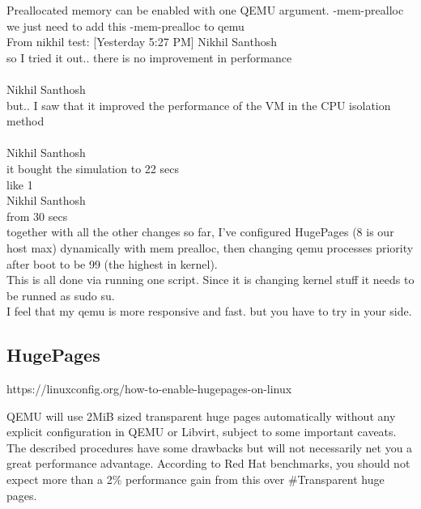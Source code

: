 \documentclass[11pt, a4paper, oneside]{article}
\theoremstyle{definition}
\begin{document}
Preallocated memory can be enabled with one QEMU argument. -mem-prealloc\\

we just need to add this -mem-prealloc to qemu\\

From nikhil test:
[Yesterday 5:27 PM] Nikhil Santhosh\\
so I tried it out.. there is no improvement in performance\\
\\
Nikhil Santhosh\\
but.. I saw that it improved the performance of the VM in the CPU isolation method\\
\\
Nikhil Santhosh\\
it bought the simulation to 22 secs\\
 like 1\\

Nikhil Santhosh\\
from 30 secs\\

together with all the other changes so far, I've configured HugePages (8 is our host max) dynamically with mem prealloc, then changing qemu processes priority after boot to be 99 (the highest in kernel).\\

This is all done via running one script. Since it is changing kernel stuff it needs to be runned as sudo su.\\

I feel that my qemu is more responsive and fast. but you have to try in your side.\\

\subsection{HugePages}

https://linuxconfig.org/how-to-enable-hugepages-on-linux

QEMU will use 2MiB sized transparent huge pages automatically without any explicit configuration in QEMU or Libvirt, subject to some important caveats.\\

The described procedures have some drawbacks but will not necessarily net you a great performance advantage. According to Red Hat benchmarks, you should not expect more than a 2$\%$ performance gain from this over $\#$Transparent huge pages.\\
\end{document}
